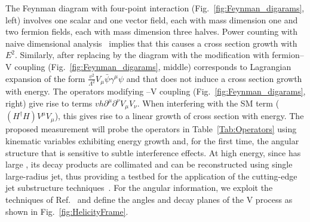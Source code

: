 \documentclass[a4paper,11pt]{article}
\renewcommand{\PV}{{{{V}}}\xspace}
\newcommand{\VH}{{{\PV}{\PH}}\xspace}
\begin{document}
The Feynman diagram with four-point interaction (Fig.~\ref{fig:Feynman_digarams}, left) involves one scalar and one vector field, each with mass dimension one and two fermion fields, each with mass dimension three halves.
Power counting with naive dimensional analysis~\cite{Manohar:1983md} implies that this causes a cross section growth with $E^2$. 
Similarly, after replacing \PH by  the diagram with the modification with fermion--\PV coupling (Fig.~\ref{fig:Feynman_digarams}, middle) 
corresponds to Lagrangian expansion of the form $\frac{v^2}{{\Lambda}^2} V_{\mu} \bar{\psi} {{\gamma}^{\mu}} {\psi}$ %
and that does not induce a cross section growth with energy. 
The operators modifying \PH--\PV coupling (Fig.~\ref{fig:Feynman_digarams}, right) give rise to terms $vh {\partial}^{\mu}{\partial}^{\nu} V_{\mu}V_{\nu}$.
When interfering with the SM term ($(H^{\dagger}H) V^{\mu}V_{\mu}$), this gives rise to a linear growth of cross section with energy.
The proposed measurement will probe the operators in Table~\ref{Tab:Operators} 
using kinematic variables exhibiting energy growth and, for the first time, the angular structure that is sensitive to subtle interference effects.
At high energy, since \PH has large \pt, its decay products are collimated and can be reconstructed using single large-radius jet, thus providing a testbed for the application of the cutting-edge jet substructure techniques~\cite{Qu:2019gqs,Sirunyan:2020lcu}.
For the angular information, we exploit the techniques of Ref.~\cite{Banerjee:2019twi} and define the angles and decay planes of the \VH process as shown in Fig.~\ref{fig:HelicityFrame}.
\end{document}
